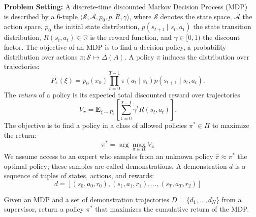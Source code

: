 \vspace{0.75em} \noindent \textbf{Problem Setting: }
A discrete-time discounted Markov Decision Process (MDP) is described by a 6-tuple $\langle \mathcal{S}, \mathcal{A}, p_0, p, R, \gamma \rangle$, where $\mathcal{S}$ denotes the state space, $\mathcal{A}$ the action space, $p_0$ the initial state distribution, $p(s_{t+1} \mid s_{t}, a_{t})$ the state transition distribution, $R(s_t, a_t) \in \mathbb{R}$ is the reward function, and $\gamma \in [0,1)$ the discount factor. 
The objective of an MDP is to find a decision policy, a probability distribution over actions $\pi: \mathcal{S} \mapsto \Delta(A)$.
A policy $\pi$ induces the distribution over trajectories:
\[
P_\pi(\xi) = p_0(x_0) \prod_{t=0}^{T-1} \pi(a_t \mid s_t) p(s_{t+1} \mid s_{t}, a_{t}).
\]
The \emph{return} of a policy is its expected total discounted reward over trajectories
\[
V_\pi = \mathbf{E}_{\xi \sim P_\pi}\left[\sum_{t=0}^{T-1} \gamma^t R(s_t,a_t)\right].
\]
The objective is to find a policy in a class of allowed policies $\pi^* \in \Pi$ to maximize the return:
\begin{equation}
\pi^* = \arg \max_{\pi \in \Pi} V_\pi 
\label{eq:main}
\end{equation}
We assume access to an expert who samples from an unknown policy $\hat{\pi} \approx \pi^*$ the optimal policy; these samples are called demonstrations. A demonstration $d$ is a sequence of tuples of states, actions, and rewards:
\[d = [(s_0,a_0,r_0),(s_1,a_1,r_1),...,(s_T,a_T,r_2)]\]

\vspace{0.25em}

\begin{problem}
Given an MDP and a set of demonstration trajectories $D = \{d_1,...,d_N\}$ from a supervisor, return a policy $\pi^*$ that maximizes the cumulative return of the MDP.
\end{problem}









